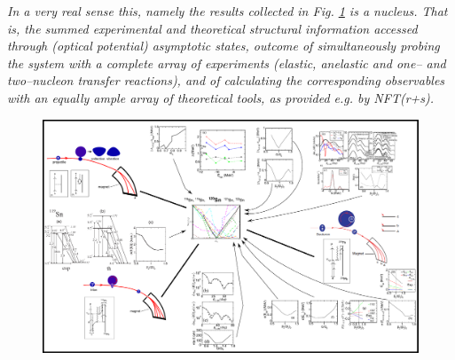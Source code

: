 \textit{
In a very real sense this, namely the results collected in Fig. \ref{fig1.4.1} is a nucleus. That is, the summed experimental and theoretical structural information accessed through (optical potential) asymptotic states, outcome of simultaneously  probing the system with a complete array of experiments (elastic, anelastic and one-- and two--nucleon transfer reactions), and of calculating the corresponding observables with an equally ample array of theoretical tools, as provided e.g. by NFT(r+s).}
          \begin{figure}
          \centerline {
          \includegraphics*[width=24cm, angle=90]{introduccion/figs/fig1_4_1}}
          \caption{}
          \label{fig1.4.1}
          \end{figure}

